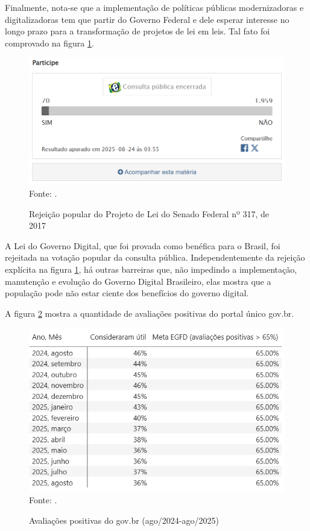 Finalmente, nota-se que a implementação de políticas públicas modernizadoras e digitalizadoras tem que partir do Governo Federal e dele esperar interesse no longo prazo para a transformação de projetos de lei em leis. Tal fato foi comprovado na figura \ref{fig:participacao_votacao_popular_lgd}.

\begin{figure}[H]
	\centering
	\caption{Rejeição popular do Projeto de Lei do Senado Federal nº 317, de 2017}
	\includegraphics[width=1\linewidth]{figuras/participacao_votacao_popular_lgd}
	\label{fig:participacao_votacao_popular_lgd}
	\footnotesize{Fonte: \cite{pls_317_2021}.}
\end{figure}

A Lei do Governo Digital, que foi provada como benéfica para o Brasil, foi rejeitada na votação popular da consulta pública. Independentemente da rejeição explícita na figura \ref{fig:participacao_votacao_popular_lgd}, há outras barreiras que, não impedindo a implementação, manutenção e evolução do Governo Digital Brasileiro, elas mostra que a população pode não estar ciente dos benefícios do governo digital.
	
A figura \ref{fig:avaliacoes_poitivas_govbr} mostra a quantidade de avaliações positivas do portal único gov.br.
	
\begin{figure}[H]
	\centering
	\caption{Avaliações positivas do gov.br (ago/2024-ago/2025)}
	\includegraphics[width=1\linewidth]{figuras/avaliacoes_poitivas_govbr}
	\label{fig:avaliacoes_poitivas_govbr}
	\footnotesize{Fonte: \cite{painel_completo_monitoramento_govbr}.}
\end{figure}

